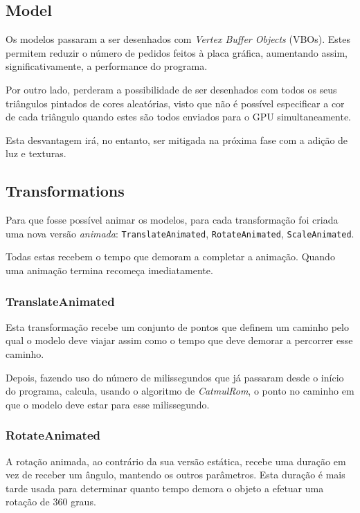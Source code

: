 \documentclass[a4paper]{article}
\begin{document}
\subsection{Model}
Os modelos passaram a ser desenhados com \textit{Vertex Buffer Objects} (VBOs). Estes permitem reduzir o número de pedidos feitos à placa gráfica, aumentando assim, significativamente, a performance do programa.

Por outro lado, perderam a possibilidade de ser desenhados com todos os seus triângulos pintados de cores aleatórias, visto que não é possível especificar a cor de cada triângulo quando estes são todos enviados para o GPU simultaneamente.

Esta desvantagem irá, no entanto, ser mitigada na próxima fase com a adição de luz e texturas.

\subsection{Transformations}
Para que fosse possível animar os modelos, para cada transformação foi criada uma nova versão \textit{animada}: \texttt{TranslateAnimated}, \texttt{RotateAnimated}, \texttt{ScaleAnimated}.

Todas estas recebem o tempo que demoram a completar a animação. Quando uma animação termina recomeça imediatamente.

\subsubsection{TranslateAnimated}

Esta transformação recebe um conjunto de pontos que definem um caminho pelo qual o modelo deve viajar assim como o tempo que deve demorar a percorrer esse caminho.

Depois, fazendo uso do número de milissegundos que já passaram desde o início do programa, calcula, usando o algoritmo de \textit{CatmulRom}, o ponto no caminho em que o modelo deve estar para esse milissegundo.

\subsubsection{RotateAnimated}

A rotação animada, ao contrário da sua versão estática, recebe uma duração em vez de receber um ângulo, mantendo os outros parâmetros. Esta duração é mais tarde usada para determinar quanto tempo demora o objeto a efetuar uma rotação de 360\degree{} graus.
\end{document}

